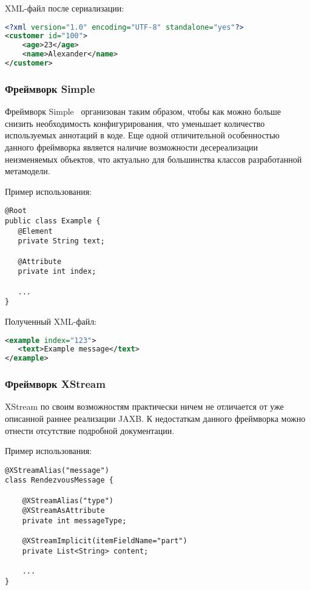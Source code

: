XML-файл после сериализации:

\begin{lstlisting}[language=xml, caption={Полученный XML-файл}]
<?xml version="1.0" encoding="UTF-8" standalone="yes"?>
<customer id="100">
    <age>23</age>
    <name>Alexander</name>
</customer>
\end{lstlisting}

\subsubsection{Фреймворк Simple}

Фреймворк Simple~\cite{SimpleXML} организован таким образом, чтобы как можно
больше снизить необходимость конфигурирования, что уменьшает количество
используемых аннотаций в коде. Еще одной отличительной особенностью данного
фреймворка является наличие возможности десереализации неизменяемых объектов,
что актуально для большинства классов разработанной метамодели.

Пример использования:

\begin{lstlisting}[caption={Пример использования фреймворка Simple}]
@Root
public class Example {
   @Element
   private String text;

   @Attribute
   private int index;

   ...
}
\end{lstlisting}

Полученный XML-файл:

\begin{lstlisting}[language=xml, caption={Полученный XML-файл}]
<example index="123">
   <text>Example message</text>
</example>
\end{lstlisting}

\subsubsection{Фреймворк XStream}

XStream по своим возможностям практически ничем не отличается от уже описанной
раннее реализации JAXB. К недостаткам данного фреймворка можно отнести
отсутствие подробной документации.

Пример использования:

\begin{lstlisting}[caption={Пример использования фреймворка XStream}]
@XStreamAlias("message")
class RendezvousMessage {

    @XStreamAlias("type")
    @XStreamAsAttribute
    private int messageType;

    @XStreamImplicit(itemFieldName="part")
    private List<String> content;

    ...
}
\end{lstlisting}

